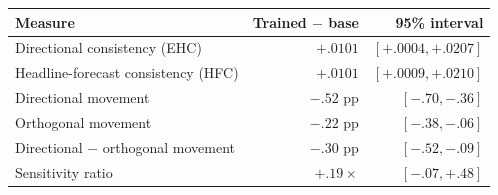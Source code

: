 \begin{tabular}{lrr}
\toprule
Measure & Trained $-$ base & 95\% interval \\
\midrule
Directional consistency (EHC) & $+.0101$ & $[+.0004,+.0207]$ \\
Headline-forecast consistency (HFC) & $+.0101$ & $[+.0009,+.0210]$ \\
Directional movement & $-.52$ pp & $[-.70,-.36]$ \\
Orthogonal movement & $-.22$ pp & $[-.38,-.06]$ \\
Directional $-$ orthogonal movement & $-.30$ pp & $[-.52,-.09]$ \\
Sensitivity ratio & $+.19\times$ & $[-.07,+.48]$ \\
\bottomrule
\end{tabular}
